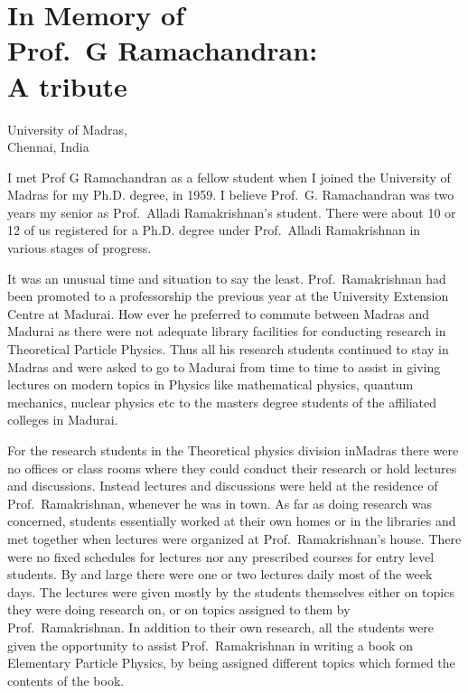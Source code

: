 \chapter[In Memory of Prof.\ G Ramachandran: A tribute]{In Memory of\\ Prof.\ G Ramachandran:\\ A tribute}\label{chap5}


\begin{center}
University of Madras,\\
Chennai, India
\end{center}

I met Prof G Ramachandran as a fellow student when I joined the University of Madras for my Ph.D. degree, in 1959. I believe Prof.\ G. Ramachandran was two years my senior as Prof.\ Alladi Ramakrishnan's student.  There were about 10 or 12 of us registered for a Ph.D. degree under Prof.\ Alladi Ramakrishnan in various stages of progress. 

It was an unusual time and situation  to say the least. Prof.\ Ramakrishnan had been promoted to a professorship the previous year at the University Extension Centre at Madurai. How ever he preferred to commute between Madras and Madurai as there were not adequate library facilities for conducting research in Theoretical Particle Physics. Thus all his research students continued to stay in Madras and were asked to go to Madurai from time to time to assist in giving lectures on modern topics in Physics like mathematical physics, quantum mechanics, nuclear physics etc to the masters degree students of the affiliated colleges in Madurai.

For the research students in the Theoretical physics division in\break Madras there were no offices or class rooms where they could conduct their research or hold lectures and discussions. Instead lectures and discussions were held at the residence of Prof.\ Ramakrishnan, whenever he was in town. As far as doing research was concerned, students essentially worked at their own homes or in the libraries and met together when lectures were organized at Prof.\  Ramakrishnan's house. There were no fixed schedules for lectures nor any prescribed courses for entry level students. By and large there were one or two lectures daily  most of the week days. The lectures were  given mostly by the students themselves either on topics they were doing research on, or on topics assigned to them by Prof.\ Ramakrishnan. In addition to their own research, all the students were given the opportunity to assist Prof.\ Ramakrishnan in writing a book on Elementary Particle Physics, by being assigned different topics which formed the contents of the book.

